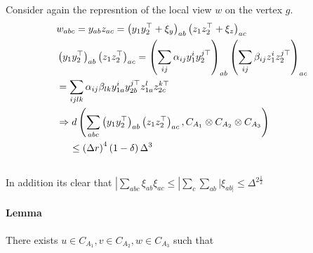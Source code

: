 \documentclass{article}
\begin{document}
\begin{multicols*}{2}
      Consider again the represntion of the local view $w$ on the vertex $g$. 
      \begin{equation*}
	\begin{split}
	  & w_{abc} = y_{ab}z_{ac} = \left( y_{1}y_{2}^{\top} + \xi_{y} \right)_{ab}   \left( z_{1}z_{2}^{\top} + \xi_{z} \right)_{ac} \\ 
	  & \left( y_{1}y_{2}^{\top}\right)_{ab}\left(z_{1}z_{2}^{\top} \right)_{ac} = 
	  \left( \sum_{ij} { \alpha_{ij} y_{1}^{i}y_{2}^{j  \top}}  \right)_{ab}\left(   \sum_{ij} { \beta_{ij} z_{1}^{i}z_{2}^{j  \top}} \right)_{ac}\\ 
	  &= \sum_{ijlk} { \alpha_{ij}\beta_{lk} y_{1a}^{i}y_{2b}^{j \top}} z_{1a}^{l}z_{2c}^{k \top} \\
	  & \Rightarrow d\left( \sum_{abc} \left( y_{1}y_{2}^{\top}\right)_{ab}\left(z_{1}z_{2}^{\top} \right)_{ac} , C_{A_{1}} \otimes C_{A_{2}} \otimes C_{A_{3}} \right) \\ 
	  & \ \ \ \ \le \left( \Delta r \right)^{4} \left( 1-\delta \right)\Delta^{3} \\ & 
	\end{split}
      \end{equation*}
      In addition its clear that $ | \sum_{abc}{\xi_{ab}\xi_{ac}}  \le | \sum_{c}\sum_{ab}{|\xi_{ab|}} \le \Delta^{ 2\frac{1}{2}} $
	\paragraph{Lemma} There exists $u \in C_{A_{1}}, v \in C_{A_{2}}, w \in C_{A_{3}}$ such that   
\end{multicols*}
\end{document}
